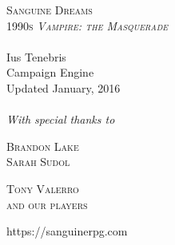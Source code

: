 \begin{titlepage}
\thispagestyle{empty}

\begin{center}

\vspace*{5cm}

\textsc{\Huge Sanguine Dreams}\\[0.5cm]

\textsc{\LARGE 1990s \emph{Vampire: the Masquerade}}\\[0.5cm]

\TitleRule \\[0.6cm]
{ \LARGE Ius Tenebris}\\[0.2cm]
{ Campaign Engine } \\[0.4cm]
{ Updated January, 2016 }\\[0.4cm]		%
\TitleRule \\[1.5cm]

\textit{With special thanks to}\\
\vspace*{0.5cm}

\begin{minipage}{0.4\textwidth}
\begin{flushleft} \large
\textsc{Brandon Lake}\\
\textsc{Sarah Sudol}\\
\end{flushleft}
\end{minipage}
\begin{minipage}{0.4\textwidth}
\begin{flushright} \large
\textsc{Tony Valerro}\\
\textsc{and our players}\\
\end{flushright}
\end{minipage}


\vspace{3.5cm}			%
{\large https://sanguinerpg.com}

\end{center}
\end{titlepage}


